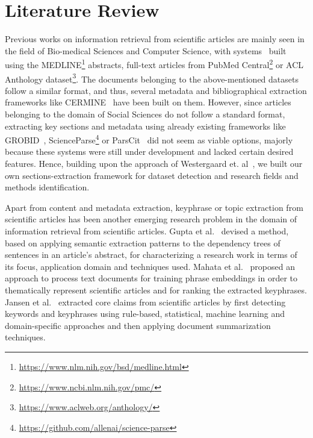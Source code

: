 \documentclass[runningheads]{llncs}
\begin{document}
	
	\section{Literature Review}
	Previous works on information retrieval from scientific articles are mainly seen in the field of Bio-medical Sciences and Computer Science, with systems~\cite{DBLP:journals/ploscb/WestergaardSTJB18} built using the MEDLINE\footnote{\url{https://www.nlm.nih.gov/bsd/medline.html}} abstracts, full-text articles from PubMed Central\footnote{\url{https://www.ncbi.nlm.nih.gov/pmc/}} or ACL Anthology
	dataset\footnote{\url{https://www.aclweb.org/anthology/}}. The documents belonging to the above-mentioned datasets follow a similar format, and thus, several metadata and bibliographical extraction frameworks like CERMINE~\cite{tkaczyk2014cermine} have been built on them. However, since articles belonging to the domain of Social Sciences do not follow a standard format, extracting key sections and metadata using already existing frameworks like GROBID~\cite{lopez2009grobid}, ScienceParse\footnote{\url{https://github.com/allenai/science-parse}} or ParsCit~\cite{councill2008parscit} did not seem as viable options, majorly because these systems were still under development and lacked certain desired features. Hence, building upon the approach of Westergaard et. al~\cite{DBLP:journals/ploscb/WestergaardSTJB18}, we built our own sections-extraction framework for dataset detection and research fields and methods identification. 
	
	Apart from content and metadata extraction, keyphrase or topic extraction from scientific articles has been another emerging research problem in the domain of information retrieval from scientific articles. Gupta et al.~\cite{gupta2011analyzing} devised a method, based on applying semantic extraction patterns to the dependency trees of sentences in an article's abstract, for characterizing a research work in terms of its focus, application domain and techniques used. Mahata et al.~\cite{mahata2018key2vec} proposed an approach to process text documents for training phrase embeddings in order to thematically represent scientific articles and for ranking the extracted keyphrases. Jansen et al.~\cite{jansen2016extracting} extracted core claims from scientific articles by first detecting keywords and keyphrases using rule-based, statistical, machine learning and domain-specific approaches and then applying document summarization techniques. 
	
\end{document}
